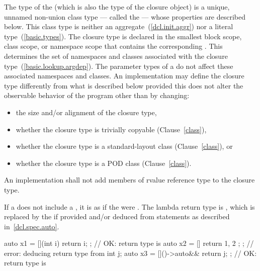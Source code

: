 \pnum
The type of the  (which is also the type of the
closure object) is a unique, unnamed non-union class type --- called the  --- whose properties are described below. This class type is neither an
aggregate~(\ref{dcl.init.aggr}) nor a literal type~(\ref{basic.types}).
The closure type is declared in the smallest block
scope, class scope, or namespace scope that contains the corresponding
. \enternote This determines the set of namespaces and
classes associated with the closure type~(\ref{basic.lookup.argdep}). The parameter
types of a  do not affect these associated namespaces and
classes. \exitnote An implementation may define the closure type differently from what
is described below provided this does not alter the observable behavior of the program
other than by changing:

\begin{itemize}
\item the size and/or alignment of the closure type,

\item whether the closure type is trivially copyable (Clause~\ref{class}),

\item whether the closure type is a standard-layout class (Clause~\ref{class}),
or

\item whether the closure type is a POD class (Clause~\ref{class}).
\end{itemize}

An implementation shall not add members of rvalue reference type to the closure
type.

\pnum
If a  does not include a
, it is as if the  were
\tcode{()}.
The lambda return type is , which is replaced by the
 if provided and/or deduced from
 statements as described in~\ref{dcl.spec.auto}.
\enterexample
\begin{codeblock}
auto x1 = [](int i){ return i; };     // OK: return type is 
auto x2 = []{ return { 1, 2 }; };     // error: deducing return type from 
int j;
auto x3 = []()->auto&& { return j; }; // OK: return type is 
\end{codeblock}
\exitexample

